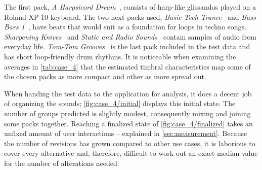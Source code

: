The first pack, \emph{A Harpsicord Dream}~\cite{pack:1793}, consists of harp-like glissandos played on a Roland XP-10 keyboard. The two next packs used, \emph{Basic Tech-Trance}~\cite{pack:1292} and \emph{Bass Bars 1}~\cite{pack:1254}, have beats that would suit as a foundation for loops in techno songs. \emph{Sharpening Knives}~\cite{pack:2280} and \emph{Static and Radio Sounds}~\cite{pack:1867} contain samples of audio from everyday life. \emph{Tom-Tom Grooves}~\cite{pack:2918} is the last pack included in the test data and has short loop-friendly drum rhythms. It is noticeable when examining the averages in \cref{tab:case_4} that the estimated timbral characteristics map some of the chosen packs as more compact and other as more spread out.

When handing the test data to the application for analysis, it does a decent job of organizing the sounds; \cref{fig:case_4/initial} displays this initial state. The number of groups predicted is slightly modest, consequently mixing and joining some packs together. Reaching a finalized state of \cref{fig:case_4/finalized} takes an unfixed amount of user interactions – explained in \cref{sec:measurement}. Because the number of revisions has grown compared to other use cases, it is laborious to cover every alternative and, therefore, difficult to work out an exact median value for the number of alterations needed.

